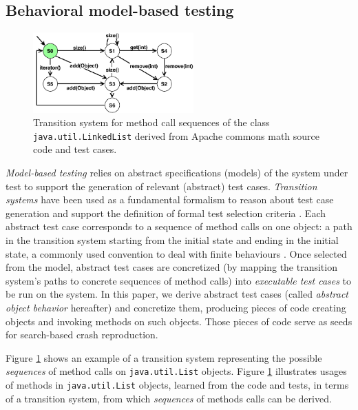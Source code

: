 \subsection{Behavioral model-based testing}

 \begin{figure}[!t]
    \centering
    \includegraphics[width=0.55\textwidth]{papers/model_seeding/figures/list.pdf}
    \caption{Transition system for method call sequences of the class \texttt{java.util.LinkedList} derived from Apache commons math source code and test cases.}
    \label{fig:list}
\end{figure}

\textit{Model-based testing} \cite{Utting2007} relies on abstract specifications (models) of the system under test to support the generation of relevant (abstract) test cases.  \textit{Transition systems} \cite{Baier2007} have been used as a fundamental formalism to reason about test case generation and support the definition of formal test selection criteria \cite{Tretmans2008}.
%
Each abstract test case corresponds to a sequence of method calls on one object: \ie a path in the transition system starting from the initial state and ending in the initial state, a commonly used convention to deal with finite behaviours \cite{Devroey2017b}.
Once selected from the model, abstract test cases are concretized (by mapping the transition system's paths to concrete sequences of method calls) into \emph{executable test cases} to be run on the system.
In this paper, we derive abstract test cases (called \emph{abstract object behavior} hereafter) and concretize them, producing pieces of code creating objects and invoking methods on such objects. Those pieces of code serve as seeds for search-based crash reproduction.

Figure \ref{fig:list} shows an example of a transition system representing the possible \emph{sequences} of method calls on \texttt{java.util.List} objects. Figure  \ref{fig:list} illustrates usages of methods in \texttt{java.util.List} objects, learned from the code and tests, in terms of a transition system, from which \textit{sequences} of methods calls can be derived.
%

